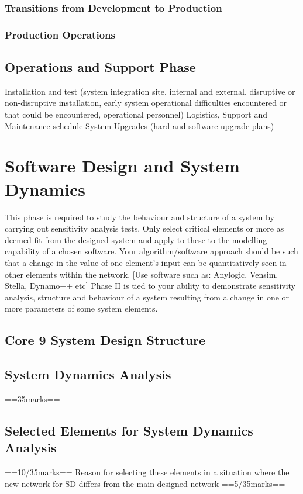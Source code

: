 \documentclass[a4paper,11pt,fleqn]{report}
\begin{document}
\subsection{Transitions from Development to Production}

\subsection{Production Operations}

\section{Operations and Support Phase}
Installation and test (system integration site, internal and external, disruptive or non-disruptive installation, early system operational difficulties encountered or that could be encountered, operational personnel)
Logistics, Support and Maintenance schedule
System Upgrades (hard and software upgrade plans)

\chapter{Software Design and System Dynamics}
This phase is required to study the behaviour and structure of a system by carrying out sensitivity analysis tests. Only select critical elements or more as deemed fit from the designed system and apply to these to the modelling capability of a chosen software.
Your algorithm/software approach should be such that a change in the value of one element’s input can be quantitatively seen in other elements within the network. [Use software such as: Anylogic, Vensim, Stella, Dynamo++ etc]
Phase II is tied to your ability to demonstrate sensitivity analysis, structure and behaviour of a system resulting from a change in one or more parameters of some system elements.

\section{Core 9 System Design Structure}

\section{System Dynamics Analysis}
==35marks==

\section{Selected Elements for System Dynamics Analysis}
==10/35marks==
Reason for selecting these elements in a situation where the new network for SD differs from the main designed network ==5/35marks==
\end{document}
